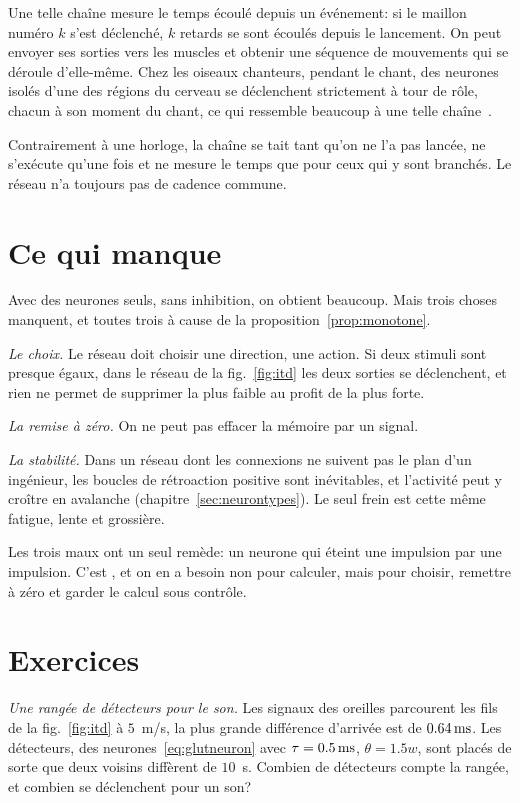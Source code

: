 Une telle chaîne mesure le temps écoulé depuis un événement: si le maillon numéro $k$ s'est déclenché, $k$ retards se sont écoulés depuis le lancement. On peut envoyer ses sorties vers les muscles et obtenir une séquence de mouvements qui se déroule d'elle-même. Chez les oiseaux chanteurs, pendant le chant, des neurones  isolés d'une des régions du cerveau se déclenchent strictement à tour de rôle, chacun à son moment du chant, ce qui ressemble beaucoup à une telle chaîne~\cite{Hahnloser2002}.

Contrairement à une horloge, la chaîne se tait tant qu'on ne l'a pas lancée, ne s'exécute qu'une fois et ne mesure le temps que pour ceux qui y sont branchés. Le réseau n'a toujours pas de cadence commune.

\section{Ce qui manque}

Avec des neurones  seuls, sans inhibition, on obtient beaucoup. Mais trois choses manquent, et toutes trois à cause de la proposition~\ref{prop:monotone}.

\emph{Le choix.} Le réseau doit choisir une direction, une action. Si deux stimuli sont presque égaux, dans le réseau de la fig.~\ref{fig:itd} les deux sorties se déclenchent, et rien ne permet de supprimer la plus faible au profit de la plus forte.

\emph{La remise à zéro.} On ne peut pas effacer la mémoire par un signal.

\emph{La stabilité.} Dans un réseau dont les connexions ne suivent pas le plan d'un ingénieur, les boucles de rétroaction positive sont inévitables, et l'activité peut y croître en avalanche (chapitre~\ref{sec:neurontypes}). Le seul frein est cette même fatigue, lente et grossière.

Les trois maux ont un seul remède: un neurone qui éteint une impulsion par une impulsion. C'est , et on en a besoin non pour calculer, mais pour choisir, remettre à zéro et garder le calcul sous contrôle.

\section{Exercices}

\begin{exercise}[\lvlA]
\label{ex:02:1}
\emph{Une rangée de détecteurs pour le son.} Les signaux des oreilles parcourent les fils de la fig.~\ref{fig:itd} à $5$~m/s, la plus grande différence d'arrivée est de $0.64\,\text{ms}$. Les détecteurs, des neurones~\eqref{eq:glutneuron} avec $\tau=0.5\,\text{ms}$, $\theta=1.5w$, sont placés de sorte que deux voisins diffèrent de $10$~\textmu s. Combien de détecteurs compte la rangée, et combien se déclenchent pour un son?
\end{exercise}

